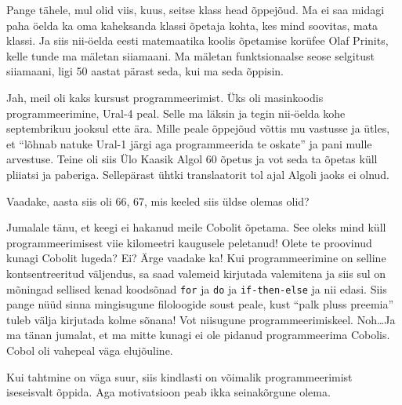 Pange tähele, mul olid viis, kuus, seitse klass head õppejõud. Ma ei saa midagi 
paha öelda ka oma kaheksanda klassi õpetaja kohta, kes mind soovitas, mata 
klassi. Ja siis nii-öelda eesti matemaatika koolis õpetamise korüfee Olaf 
Prinits, kelle tunde ma mäletan siiamaani. Ma mäletan 
funktsionaalse seose selgitust siiamaani, ligi 50 aastat pärast seda, kui ma 
seda õppisin. 


Jah, meil oli kaks kursust programmeerimist. Üks oli masinkoodis 
programmeerimine, Ural-4 peal. Selle ma läksin ja tegin 
nii-öelda kohe septembrikuu jooksul ette ära. Mille peale õppejõud võttis mu 
vastusse ja ütles, et \enquote{lõhnab natuke Ural-1 järgi aga programmeerida te 
oskate} ja pani mulle arvestuse. Teine oli siis Ülo Kaasik Algol 60 õpetus ja vot seda ta õpetas küll pliiatsi ja 
paberiga. Sellepärast ühtki translaatorit tol ajal Algoli jaoks ei olnud. 


Vaadake, aasta siis oli 66, 67, mis keeled siis  üldse olemas olid? 

Jumalale tänu, et keegi ei hakanud meile Cobolit õpetama. See 
oleks mind küll programmeerimisest viie kilomeetri kaugusele peletanud! Olete 
te proovinud kunagi Cobolit lugeda? Ei? Ärge vaadake ka! Kui programmeerimine 
on selline kontsentreeritud väljendus, sa saad valemeid kirjutada valemitena ja 
siis sul on mõningad sellised kenad koodsõnad \verb|for| ja \verb|do| ja 
\verb|if-then-else| ja nii edasi. Siis pange nüüd sinna mingisugune filoloogide 
soust peale, kust \enquote{palk pluss preemia}  tuleb välja kirjutada kolme 
sõnana! Vot niisugune programmeerimiskeel. Noh\ldots Ja ma tänan jumalat, et ma 
mitte kunagi ei ole pidanud programmeerima Cobolis. Cobol oli vahepeal väga 
elujõuline. 


Kui tahtmine on väga suur, siis kindlasti on võimalik programmeerimist 
iseseisvalt õppida. Aga  motivatsioon peab ikka seinakõrgune olema. 


